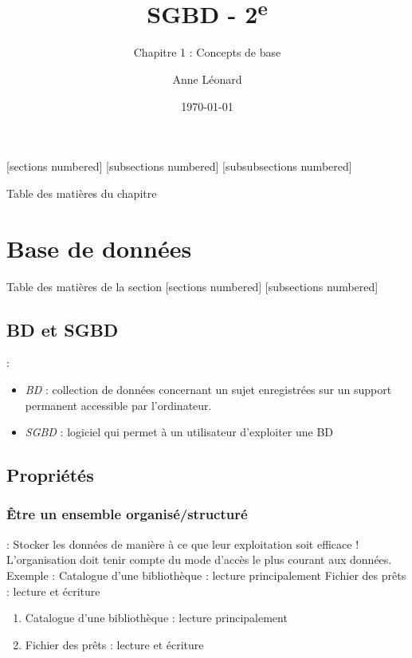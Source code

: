 \documentclass[10pt]{beamer}
\title{SGBD - 2\textsuperscript{e}}
\subtitle{Chapitre 1 : Concepts de base}
\date{\today}
\author{Anne Léonard}
\institute{Haute École de la Province de Liège}
\begin{document}
\maketitle

[sections numbered]
[subsections numbered]
[subsubsections numbered]
\begin{frame}[allowframebreaks]{Table des matières du chapitre}
    \tableofcontents[subsectionstyle=show/show/hide,subsubsectionstyle=show/show/hide,]
\end{frame}

\section{Base de données}
\begin{frame}{Table des matières de la section}
    [sections numbered]
    [subsections numbered]
    \tableofcontents[currentsection,currentsubsection,
        hideothersubsections,
        sectionstyle=show/shaded,
    ]
\end{frame}

\subsection{BD et SGBD}
\begin{frame}{\secname : \subsecname}
    \begin{itemize}
        \item \emph{BD} : collection de données concernant un sujet enregistrées sur un support permanent accessible par l’ordinateur.
        \item \emph{SGBD} : logiciel qui permet à un utilisateur d’exploiter une BD
    \end{itemize}
\end{frame}

\subsection{Propriétés}
\tocsss

\subsubsection{Être un ensemble organisé/structuré}
\begin{frame}{\subsecname : \subsubsecname}
    Stocker les données de manière à ce que leur exploitation soit efficace !
    L’organisation doit tenir compte du mode d’accès le plus courant aux données.
    Exemple :
    Catalogue d’une bibliothèque : lecture principalement
    Fichier des prêts : lecture et écriture
    \begin{enumerate}
        \item Catalogue d’une bibliothèque : lecture principalement
        \item Fichier des prêts : lecture et écriture
    \end{enumerate}
\end{frame}
\end{document}
